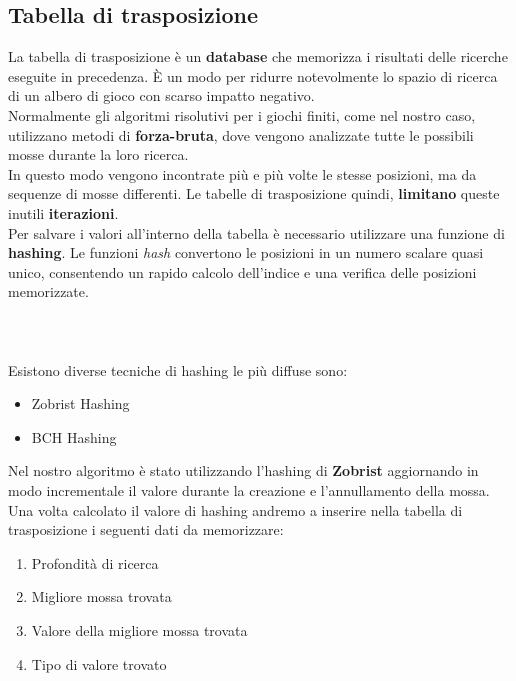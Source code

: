 \documentclass{article}
\begin{document}
    \subsection{Tabella di trasposizione}
    La tabella di trasposizione \cite{Transposition_Table} è un \textbf{database} che memorizza i risultati delle ricerche eseguite in precedenza. È un modo per ridurre notevolmente lo spazio di ricerca di un albero di gioco con scarso impatto negativo.\\
    Normalmente gli algoritmi risolutivi per i giochi finiti, come nel nostro caso, utilizzano metodi di \textbf{forza-bruta}, dove vengono analizzate tutte le possibili mosse durante la loro ricerca.\\
    In questo modo vengono incontrate più e più volte le stesse posizioni, ma da sequenze di mosse differenti. Le tabelle di trasposizione quindi, \textbf{limitano} queste inutili \textbf{iterazioni}.\\
    Per salvare i valori all'interno della tabella è necessario utilizzare una funzione di \textbf{hashing}.
    Le funzioni \textit{hash} convertono le posizioni in un numero scalare quasi unico, consentendo un rapido calcolo dell'indice e una verifica delle posizioni memorizzate.\\\\\\\\
    Esistono diverse tecniche di hashing le più diffuse sono:
    \begin{itemize}
        \item Zobrist Hashing
        \item BCH Hashing
    \end{itemize}   
    Nel nostro algoritmo è stato utilizzando l'hashing di \textbf{Zobrist} aggiornando in modo incrementale il valore durante la creazione e l'annullamento della mossa. Una volta calcolato il valore di hashing andremo a inserire nella tabella di trasposizione i seguenti dati da memorizzare:
    \begin{enumerate}
        \item Profondità di ricerca
        \item Migliore mossa trovata
        \item Valore della migliore mossa trovata
        \item Tipo di valore trovato
    \end{enumerate}
    
\end{document}
